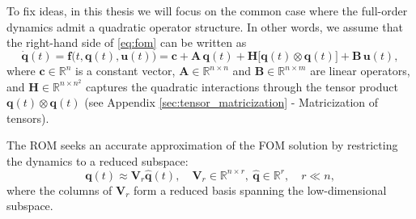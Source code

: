 To fix ideas, in this thesis we will focus on the common case where the full-order dynamics admit a quadratic operator structure.  In other words, we assume that the right-hand side of \eqref{eq:fom} can be written as\\
\begin{equation}
  \label{eq:fompoly}
  \dot{\mathbf{q}}(t)
  = \mathbf{f}\bigl(t,\mathbf{q}(t),\mathbf{u}(t)\bigr)
  = \mathbf{c}
    + \mathbf{A}\,\mathbf{q}(t)
    + \mathbf{H}\bigl[\mathbf{q}(t)\otimes\mathbf{q}(t)\bigr]
    + \mathbf{B}\,\mathbf{u}(t),
\end{equation}
where $\mathbf{c}\in\mathbb{R}^n$ is a constant vector, $\mathbf{A}\in\mathbb{R}^{n\times n}$ and $\mathbf{B}\in\mathbb{R}^{n\times m}$ are linear operators, and $\mathbf{H}\in\mathbb{R}^{n\times n^2}$ captures the quadratic interactions through the tensor product $\mathbf{q}(t) \otimes \mathbf{q}(t)$ (see Appendix \ref{sec:tensor_matricization} - Matricization of tensors).


The ROM seeks an accurate approximation of the FOM solution by restricting the dynamics to a reduced subspace:\\
\begin{equation}
    \mathbf{q}(t) \approx \mathbf{V}_r\hat{\mathbf{q}}(t), \quad \mathbf{V}_r \in \mathbb{R}^{n \times r},~\hat{\mathbf{q}}\in \mathbb{R}^{r},\quad r \ll n,
    \label{eq:subspace}
\end{equation}
where the columns of $\mathbf{V}_r$ form a reduced basis spanning the low-dimensional subspace.

